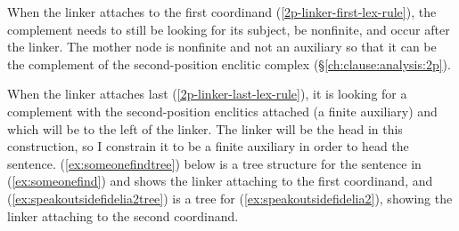 When the linker attaches to the first coordinand (\ref{2p-linker-first-lex-rule}), the complement needs to still be looking for its subject, be nonfinite, and occur after the linker. The mother node is nonfinite and not an auxiliary so that it can be the complement of the second-position enclitic complex (\S\ref{ch:clause:analysis:2p}).

When the linker attaches last (\ref{2p-linker-last-lex-rule}), it is looking for a complement with the second-position enclitics attached (a finite auxiliary) and which will be to the left of the linker. The linker will be the head in this construction, so I constrain it to be a finite auxiliary in order to head the sentence. (\ref{ex:someonefindtree}) below is a tree structure for the sentence in (\ref{ex:someonefind}) and shows the linker attaching to the first coordinand, and (\ref{ex:speakoutsidefidelia2tree}) is a tree for (\ref{ex:speakoutsidefidelia2}), showing the linker attaching to the second coordinand.

